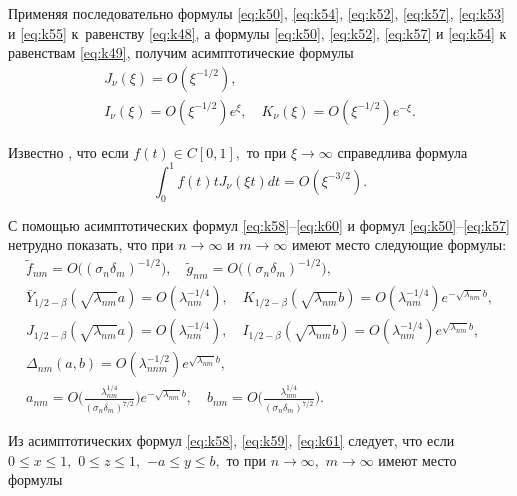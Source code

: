 Применяя последовательно формулы \eqref{eq:k50}, \eqref{eq:k54}, \eqref{eq:k52}, \eqref{eq:k57}, \eqref{eq:k53} и \eqref{eq:k55} к~равенству \eqref{eq:k48}, а формулы \eqref{eq:k50}, \eqref{eq:k52}, \eqref{eq:k57} и \eqref{eq:k54}  к равенствам \eqref{eq:k49}, получим асимптотические формулы
\begin{gather}
J_\nu(\xi)=O(\xi^{-1/2}),
\label{eq:k58}
\\
I_\nu(\xi)=O(\xi^{-1/2})e^\xi,\quad K_\nu(\xi)=O(\xi^{-1/2})e^{-\xi}.
\label{eq:k59}
\end{gather}

	Известно \cite[с.653]{uk:bib:Vatson}, что если $f(t)\in C[0,1],$  то при $\xi\to\infty$ справедлива формула
\begin{equation}
\int_0^1{f(t)tJ_\nu(\xi t)dt}=O(\xi^{-3/2}) .
\label{eq:k60}
\end{equation}

	С помощью асимптотических формул \eqref{eq:k58}--\eqref{eq:k60} и формул \eqref{eq:k50}--\eqref{eq:k57} нетрудно показать, что при $n\to\infty$  и $m\to\infty$ имеют место следующие формулы:
\begin{equation}
\begin{array}{c}
\tilde f_{nm}=O\bigl((\sigma_n\delta_m)^{-1/2}\bigr),  \quad \tilde g_{nm}=O\bigl((\sigma_n\delta_m)^{-1/2}\bigr),
\\
\bar Y_{ 1/2 -\beta}(\sqrt{\lambda_{nm}}a)=O(\lambda_{nm}^{-1/4}), \quad  
K_{ 1/2 -\beta}(\sqrt{\lambda_{nm}}b)=O(\lambda_{nm}^{-1/4})e^{-\sqrt{\lambda_{nm}}b},
\\
J_{ 1/2 -\beta}(\sqrt{\lambda_{nm}}a)=O(\lambda_{nm}^{-1/4}),\quad  
I_{ 1/2 -\beta}(\sqrt{\lambda_{nm}}b)=O(\lambda_{nm}^{-1/4})e^{\sqrt{\lambda_{nm}}b},
\\
\Delta_{nm}(a,b)=O(\lambda_{nnm}^{-1/2})e^{\sqrt{\lambda_{nm}}b},
\\
a_{nm}=O\bigl(\frac{\lambda_{nm}^{1/4}}{(\sigma_n\delta_m)^{7/2}}\bigr)e^{-\sqrt{\lambda_{nm}}b},\quad b_{nm}=O\bigl(\frac{\lambda_{nm}^{1/4}}{(\sigma_n\delta_m)^{7/2}}\bigr).
\end{array}
\label{eq:k61}
\end{equation}


	Из асимптотических формул \eqref{eq:k58}, \eqref{eq:k59}, \eqref{eq:k61} следует, что если $0 \le x \le 1,$  $0 \le z \le 1,$ $ - a \le y \le b,$ то при $n \to \infty ,$  $m \to \infty $ имеют место формулы

